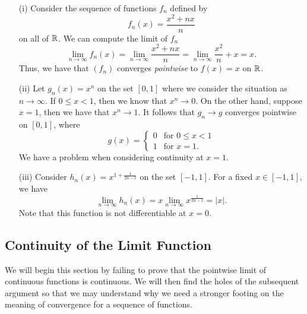 \begin{enumerate}
    \item[(i)] Consider the sequence of functions \( f_n  \) defined by 
        \[  f_n(x) = \frac{ x^2 + nx  }{ n } \]
        on all of \( \mathbb{R}  \). We can compute the limit of \( f_n  \)
        \[  \lim_{ n \to \infty  } f_n(x) = \lim_{ n \to \infty  } \frac{ x^2 + nx  }{ n  } = \lim_{ n \to \infty  } \frac{ x^2  }{ n } + x  = x. \] Thus, we have that \( (f_n) \) converges \textit{pointwise} to \( f(x) = x  \) on \( \mathbb{R}  \).
    \item[(ii)] Let \( g_n(x) = x^n  \) on the set \( [0,1]  \) where we consider the situation as \( n \to \infty  \). If \( 0 \leq x < 1  \), then we know that \( x^n \to 0  \). On the other hand, suppose \( x = 1  \), then we have that \( x^n \to 1  \). It follows that \( g_n \to g  \) converges pointwise on \( [0,1] \), where 
        \[  g(x) = 
        \begin{cases}
            0 &\text{for } 0 \leq x < 1 \\
            1 &\text{for } x = 1.
        \end{cases} \]
        We have a problem when considering continuity at \( x = 1  \).
    \item[(iii)] Consider \( h_n(x) = x^{1+ \frac{ 1 }{ 2n - 1  } } \) on the set \( [-1,1]  \). For a fixed \( x \in [-1,1]  \), we have 
        \[  \lim_{ n \to \infty  } h_n(x) = x \lim_{ n \to \infty  } x^{\frac{ 1 }{ 2n-1 } }  = | x  |.\]
        Note that this function is not differentiable at \( x = 0  \).
\end{enumerate}

\subsection{Continuity of the Limit Function}

We will begin this section by failing to prove that the pointwise limit of continuous functions is continuous. We will then find the holes of the subsequent argument so that we may understand why we need a stronger footing on the meaning of convergence for a sequence of functions.

